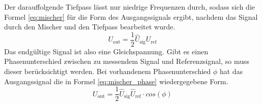 %
Der darauffolgende Tiefpass lässt nur niedrige Frequenzen durch, sodass
sich die Formel \eqref{eq:mischer} für die Form des
Ausgangssignals ergibt, nachdem das Signal durch den Mischer und den
Tiefpass bearbeitet wurde.
%
\begin{equation}
  \label{eq:mischer}
  U_\text{out} = \frac{1}{2} \widehat{U}_\text{sig} \widehat{U}_\text{ref}
\end{equation}
%
Das endgültige Signal ist also eine Gleichspannung.
Gibt es einen Phasenunterschied zwischen zu messendem Signal und Referenzsignal, so muss dieser berücksichtigt werden. Bei vorhandenem Phasenunterschied $\phi$ hat das Ausgangssignal die in Formel \eqref{eq:mischer_phase} wiedergegebene Form.
\begin{equation}
  \label{eq:mischer_phase}
   U_\text{out} = \frac{1}{2} \widehat{U}_\text{sig} \widehat{U}_\text{ref} \cdot cos(\phi)
\end{equation}
